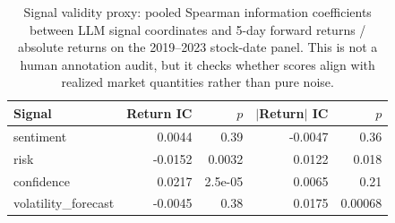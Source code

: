 \begin{table}[htbp]
\centering
\caption{Signal validity proxy: pooled Spearman information coefficients between LLM signal coordinates and 5-day forward returns / absolute returns on the 2019--2023 stock-date panel. This is not a human annotation audit, but it checks whether scores align with realized market quantities rather than pure noise.}
\label{tab:signal_ic}
\begin{tabular}{lrrrr}
\toprule
\textbf{Signal} & \textbf{Return IC} & \textbf{$p$} & \textbf{$|$Return$|$ IC} & \textbf{$p$} \\
\midrule
sentiment & 0.0044 & 0.39 & -0.0047 & 0.36 \\
risk & -0.0152 & 0.0032 & 0.0122 & 0.018 \\
confidence & 0.0217 & 2.5e-05 & 0.0065 & 0.21 \\
volatility\_forecast & -0.0045 & 0.38 & 0.0175 & 0.00068 \\
\bottomrule
\end{tabular}
\end{table}
